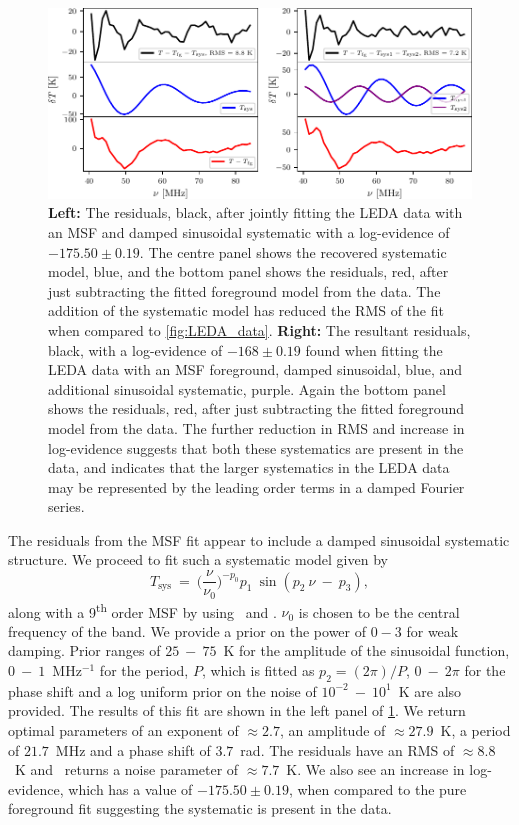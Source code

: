 \begin{figure}
    \centering
    \includegraphics{maxsmooth/figs/Figure13.pdf}
    \caption{\textbf{Left:} The residuals, black, after jointly fitting the LEDA data with an MSF and damped sinusoidal systematic with a log-evidence of $-175.50\pm0.19$. The centre panel shows the recovered systematic model, blue, and the bottom panel shows the residuals, red, after just subtracting the fitted foreground model from the data. The addition of the systematic model has reduced the RMS of the fit when compared to \cref{fig:LEDA_data}. \textbf{Right:} The resultant residuals, black, with a log-evidence of $-168\pm0.19$ found when fitting the LEDA data with an MSF foreground, damped sinusoidal, blue, and additional sinusoidal systematic, purple. Again the bottom panel shows the residuals, red, after just subtracting the fitted foreground model from the data. The further reduction in RMS and increase in log-evidence suggests that both these systematics are present in the data, and indicates that the larger systematics in the LEDA data may be represented by the leading order terms in a damped Fourier series.}
    \label{fig:LEDA_resid}
\end{figure}

The residuals from the MSF fit appear to include a damped sinusoidal systematic structure. We proceed to fit such a systematic model given by
\begin{equation}
    T_\mathrm{sys}~=~\bigg(\frac{\nu}{\nu_0}\bigg)^{-p_0} p_1~\sin(p_2~\nu~-~p_3),
    \label{eq:damp_sine_sys}
\end{equation}
along with a 9\textsuperscript{th} order MSF by using \maxsmooth~and \multinest. $\nu_0$ is chosen to be the central frequency of the band. We provide a prior on the power of $0 - 3$ for weak damping. Prior ranges of $25~-~75$~K for the amplitude of the sinusoidal function, $0~-~1$~MHz$^{-1}$ for the period, $P$, which is fitted as $p_2=(2\pi)/P$, $0~-~2\pi$ for the phase shift and a log uniform prior on the noise of $10^{-2}~-~10^{1}$~K are also provided. The results of this fit are shown in the left panel of \cref{fig:LEDA_resid}. We return optimal parameters of an exponent of $\approx 2.7$, an amplitude of $\approx 27.9$~K, a period of $21.7$~MHz and a phase shift of $3.7$~rad. The residuals have an RMS of $\approx 8.8$~K and \multinest~returns a noise parameter of $\approx 7.7$~K. We also see an increase in log-evidence, which has a value of $-175.50\pm0.19$, when compared to the pure foreground fit suggesting the systematic is present in the data.

